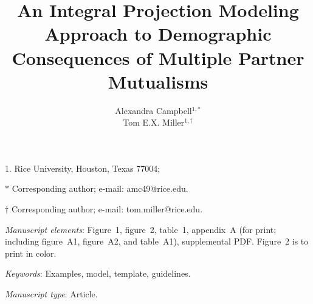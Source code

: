 \documentclass[11pt]{article}\usepackage[sc]{mathpazo} %
\title{An Integral Projection Modeling Approach to Demographic Consequences of Multiple Partner Mutualisms }
\author{Alexandra Campbell$^{1,\ast}$ \\ 
Tom E.X. Miller$^{1,\dag}$}
\date{}
\begin{document}
\maketitle

\noindent{} 1. Rice University, Houston, Texas 77004;

\noindent{} $\ast$ Corresponding author; e-mail: amc49@rice.edu.

\noindent{} $\dag$ Corresponding author; e-mail: tom.miller@rice.edu.

\textit{Manuscript elements}: Figure~1, figure~2, table~1, appendix~A (for print; including figure~A1, figure~A2, and table~A1), supplemental PDF. Figure~2 is to print in color.

\bigskip

\textit{Keywords}: Examples, model, template, guidelines.

\bigskip

\textit{Manuscript type}: Article.

\bigskip


\linenumbers{}
\modulolinenumbers[3]

\newpage{}
\end{document}
